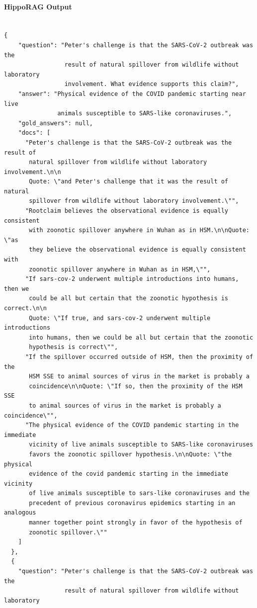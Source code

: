 \documentclass{article}
\begin{document}
\paragraph{HippoRAG Output}
\begin{verbatim}

{
    "question": "Peter's challenge is that the SARS-CoV-2 outbreak was the 
                 result of natural spillover from wildlife without laboratory 
                 involvement. What evidence supports this claim?",
    "answer": "Physical evidence of the COVID pandemic starting near live 
               animals susceptible to SARS-like coronaviruses.",
    "gold_answers": null,
    "docs": [
      "Peter's challenge is that the SARS-CoV-2 outbreak was the result of 
       natural spillover from wildlife without laboratory involvement.\n\n
       Quote: \"and Peter's challenge that it was the result of natural 
       spillover from wildlife without laboratory involvement.\"",
      "Rootclaim believes the observational evidence is equally consistent 
       with zoonotic spillover anywhere in Wuhan as in HSM.\n\nQuote: \"as 
       they believe the observational evidence is equally consistent with 
       zoonotic spillover anywhere in Wuhan as in HSM,\"",
      "If sars-cov-2 underwent multiple introductions into humans, then we 
       could be all but certain that the zoonotic hypothesis is correct.\n\n
       Quote: \"If true, and sars-cov-2 underwent multiple introductions 
       into humans, then we could be all but certain that the zoonotic 
       hypothesis is correct\"",
      "If the spillover occurred outside of HSM, then the proximity of the 
       HSM SSE to animal sources of virus in the market is probably a 
       coincidence\n\nQuote: \"If so, then the proximity of the HSM SSE 
       to animal sources of virus in the market is probably a coincidence\"",
      "The physical evidence of the COVID pandemic starting in the immediate 
       vicinity of live animals susceptible to SARS-like coronaviruses 
       favors the zoonotic spillover hypothesis.\n\nQuote: \"the physical 
       evidence of the covid pandemic starting in the immediate vicinity 
       of live animals susceptible to sars-like coronaviruses and the 
       precedent of previous coronavirus epidemics starting in an analogous 
       manner together point strongly in favor of the hypothesis of 
       zoonotic spillover.\""
    ]
  },
  {
    "question": "Peter's challenge is that the SARS-CoV-2 outbreak was the 
                 result of natural spillover from wildlife without laboratory 

\end{verbatim}
\end{document}
